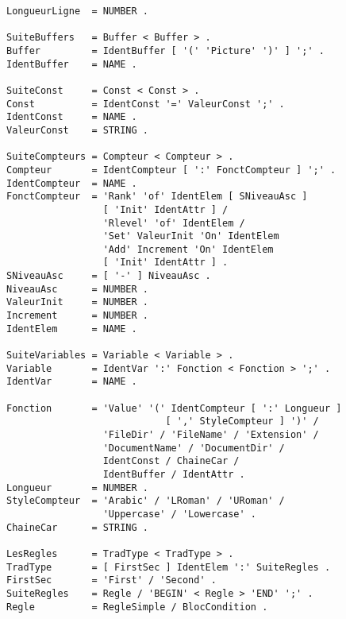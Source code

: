 {\begin{verbatim}
LongueurLigne  = NUMBER .

SuiteBuffers   = Buffer < Buffer > .
Buffer         = IdentBuffer [ '(' 'Picture' ')' ] ';' .
IdentBuffer    = NAME .

SuiteConst     = Const < Const > .
Const          = IdentConst '=' ValeurConst ';' .
IdentConst     = NAME .
ValeurConst    = STRING .

SuiteCompteurs = Compteur < Compteur > .
Compteur       = IdentCompteur [ ':' FonctCompteur ] ';' .
IdentCompteur  = NAME .
FonctCompteur  = 'Rank' 'of' IdentElem [ SNiveauAsc ]
                 [ 'Init' IdentAttr ] /
                 'Rlevel' 'of' IdentElem /
                 'Set' ValeurInit 'On' IdentElem
                 'Add' Increment 'On' IdentElem
                 [ 'Init' IdentAttr ] .
SNiveauAsc     = [ '-' ] NiveauAsc .
NiveauAsc      = NUMBER .
ValeurInit     = NUMBER .
Increment      = NUMBER .
IdentElem      = NAME .

SuiteVariables = Variable < Variable > .
Variable       = IdentVar ':' Fonction < Fonction > ';' .
IdentVar       = NAME .

Fonction       = 'Value' '(' IdentCompteur [ ':' Longueur ]
                            [ ',' StyleCompteur ] ')' /
                 'FileDir' / 'FileName' / 'Extension' /
                 'DocumentName' / 'DocumentDir' /
                 IdentConst / ChaineCar /
                 IdentBuffer / IdentAttr .
Longueur       = NUMBER .
StyleCompteur  = 'Arabic' / 'LRoman' / 'URoman' /
                 'Uppercase' / 'Lowercase' .
ChaineCar      = STRING .

LesRegles      = TradType < TradType > .
TradType       = [ FirstSec ] IdentElem ':' SuiteRegles .
FirstSec       = 'First' / 'Second' .
SuiteRegles    = Regle / 'BEGIN' < Regle > 'END' ';' .
Regle          = RegleSimple / BlocCondition .


\end{verbatim}}
